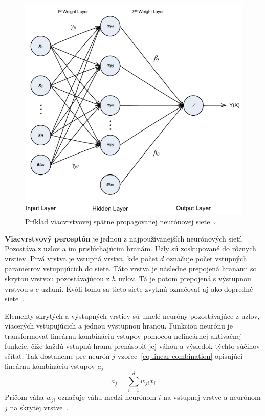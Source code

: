 \documentclass[a4paper,slovak,12pt,appendix]{article}
\begin{document}
\begin{figure}[!ht]
  \centering
  \includegraphics[width=\textwidth]{neural_network.png}
  \caption{Príklad viacvrstvovej spätne propagovanej neurónovej siete~\cite{Kennedy2002}.}
  \label{fig-neural-network}
\end{figure}

\textbf{Viacvrstvový perceptón} je jednou z najpoužívanejších neurónových
sietí. Pozostáva z uzlov a im prislúchajúcim hranám. Uzly sú zoskupované do
rôznych vrstiev. Prvá vrstva je vstupná vrstva, kde počet $d$ označuje počet
vstupných parametrov vstupujúcich do siete. Táto vrstva je následne prepojená
hranami so skrytou vrstvou pozostávajúcou z $h$ uzlov. Tá je potom prepojená
s výstupnou vrstvou s $c$ uzlami. Kvôli tomu sa tieto siete zvyknú označovať aj
ako dopredné siete~\cite{Merz1998}.

Elementy skrytých a výstupných vrstiev sú umelé neuróny pozostávajúce z uzlov,
viacerých vstupujúcich a jednou výstupnou hranou. Funkciou neurónu je
transformovať lineárnu kombináciu vstupov pomocou nelineárnej aktivačnej
funkcie, čiže každú vstupnú hranu prenásobiť jej váhou a výsledok týchto súčinov
sčítať. Tak dostaneme pre neurón $j$ vzorec~\ref{eq-linear-combination}
opisujúci lineárnu kombináciu vstupov $a_j$
\begin{equation}
  a_j = \sum_{i=1}^{d} w_{ji} x_i
  \label{eq-linear-combination}
\end{equation}
Pričom váha $w_{ji}$ označuje váhu medzi neurónom $i$ na vstupnej vrstve
a neurónom $j$ na skrytej vrstve~\cite{Merz1998}.
\end{document}
